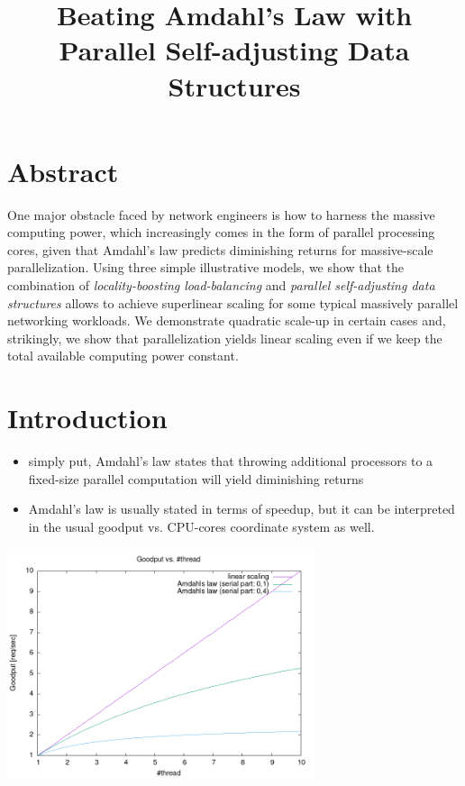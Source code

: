 \documentclass[11pt]{article}
\date{}
\title{Beating Amdahl's Law with Parallel Self-adjusting Data Structures}
\begin{document}
\maketitle
{}

\section{Abstract}
\label{sec:org672edee}
One major obstacle faced by network engineers is how to harness the massive computing power, which
increasingly comes in the form of parallel processing cores, given that Amdahl's law predicts
diminishing returns for massive-scale parallelization.  Using three simple illustrative models, we
show that the combination of \emph{locality-boosting load-balancing} and \emph{parallel self-adjusting data
structures} allows to achieve superlinear scaling for some typical massively parallel networking
workloads. We demonstrate quadratic scale-up in certain cases and, strikingly, we show that
parallelization yields linear scaling even if we keep the total available computing power constant.

\section{Introduction}
\label{sec:orge0719da}
\begin{itemize}
\item simply put, Amdahl's law states that throwing additional processors to a fixed-size parallel
computation will yield diminishing returns
\item Amdahl's law is usually stated in terms of speedup, but it can be interpreted in the usual
goodput vs. CPU-cores coordinate system as well.
\end{itemize}

\begin{center}
\includegraphics[width=9cm]{usl.png}
\end{center}
\end{document}
